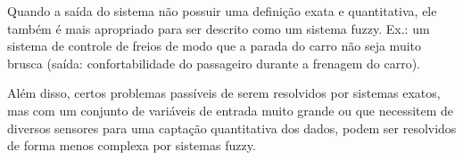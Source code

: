 \documentclass{report}
\begin{document}
\begin{enumerate}
\begin{enumerate}
Quando a saída do sistema não possuir uma definição
exata e quantitativa, ele também é mais apropriado para ser descrito como um sistema fuzzy.
Ex.: um sistema de controle de freios de modo que a parada do carro não seja muito brusca (saída: confortabilidade
do passageiro durante a frenagem do carro).

Além disso, certos problemas passíveis de serem resolvidos por sistemas exatos, mas com um conjunto de variáveis
de entrada muito grande ou que necessitem de diversos sensores para uma captação quantitativa dos dados,
podem ser resolvidos de forma menos complexa por sistemas fuzzy.

\end{enumerate}

\end{enumerate}
\end{document}
